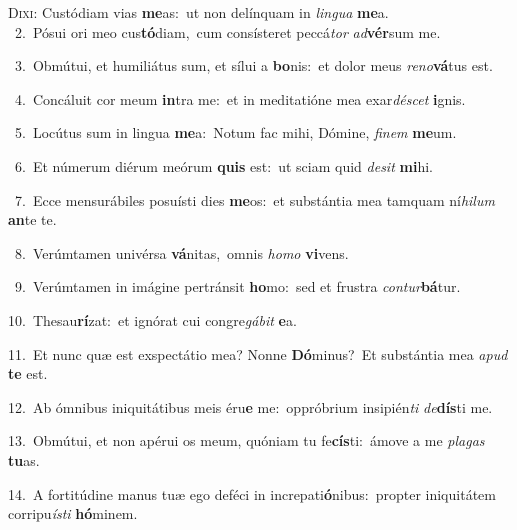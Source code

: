 \lettrine{\initial\textcolor{\initialcolor}{D}}{ixi:} Custódiam vias \textbf{me}\-as:~\star ut non delínquam in \textit{lin}\-\textit{gua} \textbf{me}\-a.\\
{\numbfont\textcolor{\numbcolor}{~2.}}~Pósui ori meo cus\-\textbf{tó}\-diam,~\star cum consísteret peccá\textit{tor} \textit{ad}\-\textbf{vér}sum me.\par
{\numbfont\textcolor{\numbcolor}{~3.}}~Obmútui, et humiliátus sum, et sílui a \textbf{bo}\-nis:~\star et dolor meus \textit{re}\-\textit{no}\textbf{vá}tus est.\par
{\numbfont\textcolor{\numbcolor}{~4.}}~Concáluit cor meum \textbf{in}\-tra me:~\star et in meditatióne mea exar\-\textit{dé}\-\textit{scet} \textbf{i}\-gnis.\par
{\numbfont\textcolor{\numbcolor}{~5.}}~Locútus sum in lingua \textbf{me}\-a:~\star Notum fac mihi, Dómine, \textit{fi}\-\textit{nem} \textbf{me}\-um.\par
{\numbfont\textcolor{\numbcolor}{~6.}}~Et númerum diérum meórum \textbf{quis} est:~\star ut sciam quid \textit{de}\-\textit{sit} \textbf{mi}\-hi.\par
{\numbfont\textcolor{\numbcolor}{~7.}}~Ecce mensurábiles posuísti dies \textbf{me}\-os:~\star et substántia mea tamquam ní\-\textit{hi}\-\textit{lum} \textbf{an}\-te te.\par
{\numbfont\textcolor{\numbcolor}{~8.}}~Verúmtamen univérsa \textbf{vá}\-nitas,~\star omnis \textit{ho}\-\textit{mo} \textbf{vi}\-vens.\par
{\numbfont\textcolor{\numbcolor}{~9.}}~Verúmtamen in imágine pertránsit \textbf{ho}\-mo:~\star sed et frustra \textit{con}\-\textit{tur}\textbf{bá}tur.\par
{\numbfont\textcolor{\numbcolor}{10.}}~Thesau\-\textbf{rí}\-zat:~\star et ignórat cui congre\-\textit{gá}\-\textit{bit} \textbf{e}\-a.\par
{\numbfont\textcolor{\numbcolor}{11.}}~Et nunc quæ est exspectátio mea? Nonne \textbf{Dó}\-minus?~\star Et substántia mea \textit{a}\-\textit{pud} \textbf{te} est.\par
{\numbfont\textcolor{\numbcolor}{12.}}~Ab ómnibus iniquitátibus meis éru\textbf{e} me:~\star oppróbrium insipién\textit{ti} \textit{de}\-\textbf{dís}ti me.\par
{\numbfont\textcolor{\numbcolor}{13.}}~Obmútui, et non apérui os meum, quóniam tu fe\-\textbf{cís}\-ti:~\star ámove a me \textit{pla}\-\textit{gas} \textbf{tu}\-as.\par
{\numbfont\textcolor{\numbcolor}{14.}}~A fortitúdine manus tuæ ego deféci in increpati\-\textbf{ó}\-nibus:~\star propter iniquitátem corripu\-\textit{ís}\-\textit{ti} \textbf{hó}\-minem.\par
